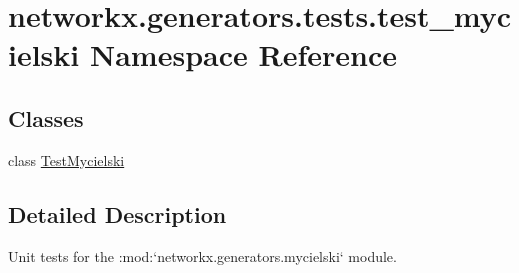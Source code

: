 \hypertarget{namespacenetworkx_1_1generators_1_1tests_1_1test__mycielski}{}\section{networkx.\+generators.\+tests.\+test\+\_\+mycielski Namespace Reference}
\label{namespacenetworkx_1_1generators_1_1tests_1_1test__mycielski}
\subsection*{Classes}
\begin{DoxyCompactItemize}
\item 
class \hyperlink{classnetworkx_1_1generators_1_1tests_1_1test__mycielski_1_1TestMycielski}{Test\+Mycielski}
\end{DoxyCompactItemize}


\subsection{Detailed Description}
\begin{DoxyVerb}Unit tests for the :mod:`networkx.generators.mycielski` module.\end{DoxyVerb}
 